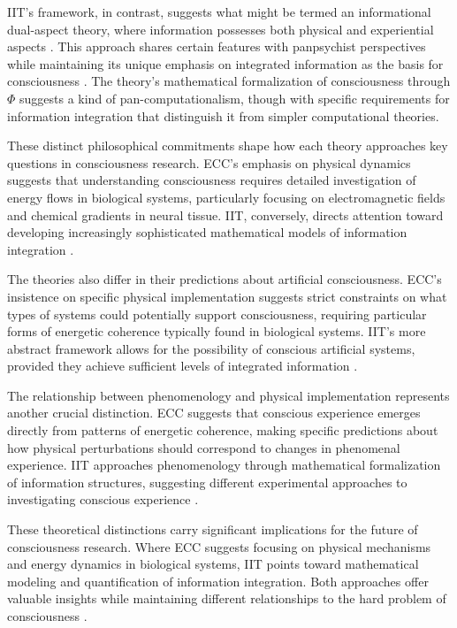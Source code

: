 \begin{refsection}
IIT's framework, in contrast, suggests what might be termed an informational dual-aspect theory, where information possesses both physical and experiential aspects \cite{Tononi2016}. This approach shares certain features with panpsychist perspectives while maintaining its unique emphasis on integrated information as the basis for consciousness \cite{Mathews2011}. The theory's mathematical formalization of consciousness through $\Phi$ suggests a kind of pan-computationalism, though with specific requirements for information integration that distinguish it from simpler computational theories.

These distinct philosophical commitments shape how each theory approaches key questions in consciousness research. ECC's emphasis on physical dynamics suggests that understanding consciousness requires detailed investigation of energy flows in biological systems, particularly focusing on electromagnetic fields and chemical gradients in neural tissue. IIT, conversely, directs attention toward developing increasingly sophisticated mathematical models of information integration \cite{Oizumi2014}.

The theories also differ in their predictions about artificial consciousness. ECC's insistence on specific physical implementation suggests strict constraints on what types of systems could potentially support consciousness, requiring particular forms of energetic coherence typically found in biological systems. IIT's more abstract framework allows for the possibility of conscious artificial systems, provided they achieve sufficient levels of integrated information \cite{Koch2019}.

The relationship between phenomenology and physical implementation represents another crucial distinction. ECC suggests that conscious experience emerges directly from patterns of energetic coherence, making specific predictions about how physical perturbations should correspond to changes in phenomenal experience. IIT approaches phenomenology through mathematical formalization of information structures, suggesting different experimental approaches to investigating conscious experience \cite{Shani2015}.

These theoretical distinctions carry significant implications for the future of consciousness research. Where ECC suggests focusing on physical mechanisms and energy dynamics in biological systems, IIT points toward mathematical modeling and quantification of information integration. Both approaches offer valuable insights while maintaining different relationships to the hard problem of consciousness \cite{Goff2019}.


\end{refsection}
